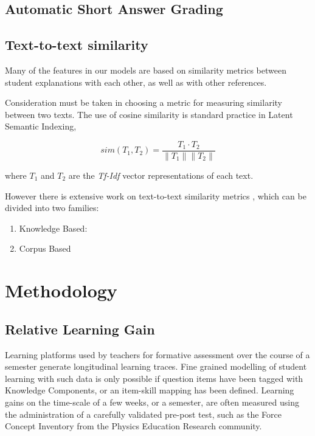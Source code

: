 \documentclass[sigconf]{acmart}
\begin{document}
\subsection{Automatic Short Answer Grading}


\subsection{Text-to-text similarity}
Many of the features in our models are based on 
similarity 
metrics between 
student explanations with each other, as well as 
with other 
references. 

Consideration must be taken in choosing a metric 
for measuring 
similarity 
between two texts. 
The use of cosine similarity is standard practice 
in Latent 
Semantic 
Indexing,

\begin{equation}
sim(T_1,T_2) = \frac{T_1 \cdot T_2}{\| T_1 \| \| 
T_2 \|}
\end{equation}

where $T_1$ and $T_2$ are the \textit{Tf-Idf} 
vector 
representations of 
each text.

However there is extensive work on text-to-text 
similarity 
metrics 
\cite{mihalcea_corpus-based_2006}, 
which can be divided into two families:
\begin{enumerate}
	\item Knowledge Based:
	\item Corpus Based
\end{enumerate}


\section{Methodology}

\subsection{Relative Learning Gain}
Learning platforms used by teachers for 
formative assessment 
over the course of 
a semester generate longitudinal learning 
traces. 
Fine grained modelling of student 
learning with such data is 
only possible if 
question items have been tagged with 
Knowledge Components\cite{corbett_knowledge_1994}, or an 
item-skill 
mapping\cite{barnes_q-matrix_2005} has been defined.
Learning gains on the time-scale of a few 
weeks, or a semester, 
are often 
measured using the administration of a 
carefully validated 
pre-post test, such 
as the Force Concept Inventory\cite{hestenes_force_1992} from the 
Physics Education 
Research community.
\end{document}
